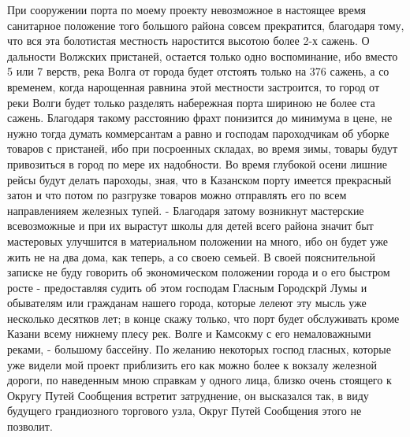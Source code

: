 \documentclass[oneside,final,14pt]{extreport}
\begin{document}
При сооружении порта по моему проекту невозможное в настоящее время санитарное положение того большого района совсем прекратится, благодаря тому, что вся эта болотистая местность наростится высотою более 2-х сажень. О дальности Волжских пристаней, остается только одно воспоминание, ибо вместо 5 или 7 верств, река Волга от города будет отстоять только на 376 сажень, а со временем, когда нарощенная равнина этой местности застроится, то город от реки Волги будет только разделять набережная порта шириною не более ста сажень. Благодаря такому расстоянию фрахт понизится до минимума в цене, не нужно тогда думать коммерсантам а равно и господам пароходчикам об уборке товаров с пристаней, ибо при посроенных складах, во время зимы, товары будут привозиться в город по мере их надобности. Во время глубокой осени лишние рейсы будут делать пароходы, зная, что в Казанском порту имеется прекрасный затон и что потом по разгрузке товаров можно отправлять его по всем направленияем железных тупей. - Благодаря затому возникнут мастерские всевозможные и при их вырастут школы для детей всего района значит быт мастеровых улучшится в материальном положении на много, ибо он будет уже жить не на два дома, как теперь, а со своею семьей. В своей пояснительной записке не буду говорить об экономическом положении города и о его быстром росте - предоставляя судить об этом господам Гласным Городскрй Лумы и обывателям или гражданам нашего города, которые лелеют эту мысль уже несколько десятков лет; в конце скажу только, что порт будет обслуживать кроме Казани всему нижнему плесу рек. Волге и Камсокму с его немаловажными реками, - большому бассейну. По желанию некоторых господ гласных, которые уже видели мой проект приблизить его как можно более к вокзалу железной дороги, по наведенным мною справкам у одного лица, близко очень стоящего к Округу Путей Сообщения встретит затруднение, он высказался так, в виду будущего грандиозного торгового узла, Округ Путей Сообщения этого не позволит.
\end{document}

